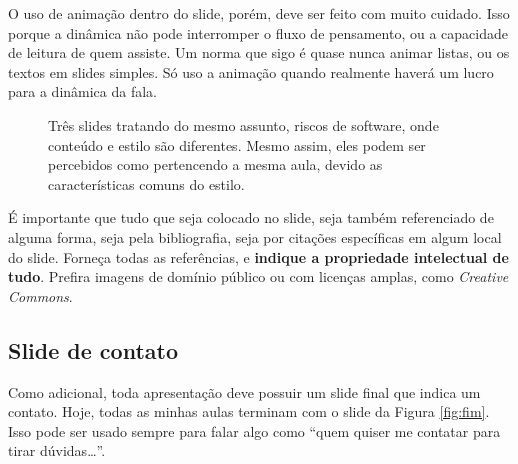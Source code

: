O uso de animação dentro do slide, porém, deve ser feito com muito cuidado. Isso porque a dinâmica não pode interromper o fluxo de pensamento, ou a capacidade de leitura de quem assiste. Um norma que sigo é quase nunca animar listas, ou os textos em slides simples. Só uso a animação quando realmente haverá um lucro para a dinâmica da fala.

\begin{figure}
    \centering
\caption{Três slides tratando do mesmo assunto, riscos de software, onde conteúdo e estilo são diferentes. Mesmo assim, eles podem ser percebidos como pertencendo a mesma aula, devido as características comuns do estilo.}
\label{fig:tres}
\end{figure}


É importante que tudo que seja colocado no slide, seja também referenciado de alguma forma, seja pela bibliografia, seja por citações específicas em algum local do slide.
Forneça todas as referências, e \textbf{indique a propriedade intelectual de tudo}. Prefira imagens de domínio público ou com licenças amplas, como \textit{Creative Commons}.


\subsection{Slide de contato}

Como adicional, toda apresentação deve possuir um slide final que indica um contato. Hoje, todas as minhas aulas terminam com o slide da Figura \ref{fig:fim}. Isso pode ser usado sempre para falar algo como ``quem quiser me contatar para tirar dúvidas\dots''.

